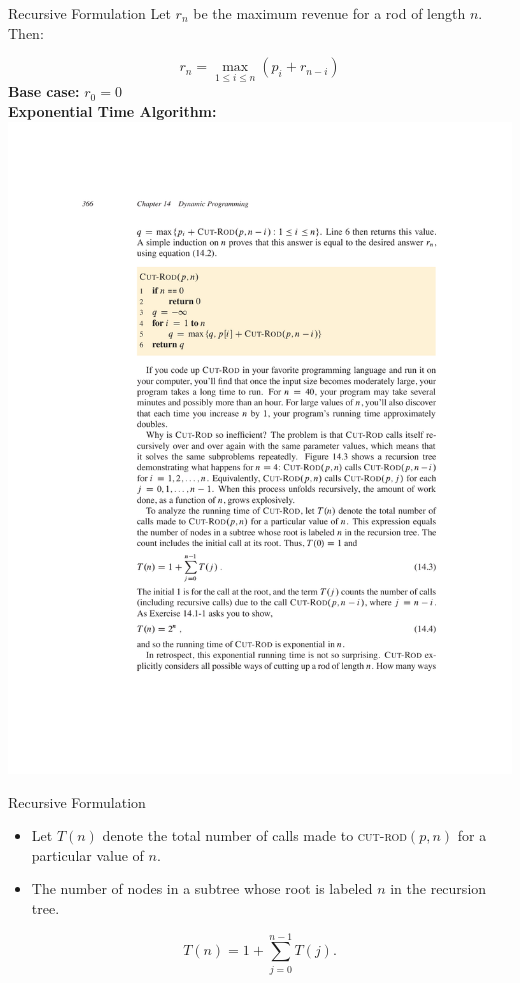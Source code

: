 \documentclass[aspectratio=169]{beamer}
\begin{document}
\begin{frame}{Recursive Formulation}
    Let $r_n$ be the maximum revenue for a rod of length $n$. Then:

    \[
        r_n = \max_{1 \leq i \leq n} (p_i + r_{n-i})
    \]
    \textbf{Base case:} $r_0 = 0$ \\

    \vspace{1em}
    \textbf{Exponential Time Algorithm:}
    \centering
    \includegraphics[width=\textwidth,clip=true,trim=4.75cm 18cm 3cm 6cm]{figures/p366}
\end{frame}

\begin{frame}{Recursive Formulation}
    \begin{itemize}
        \item Let $T(n)$ denote the total number of calls made to \textsc{cut-rod}$(p,n)$ for a particular value of $n$.
        \item The number of nodes in a subtree whose root is labeled $n$ in the recursion tree.
    \end{itemize}
    $$
        T(n) = 1 + \sum_{j = 0}^{n - 1} T(j).
    $$
\end{frame}
\end{document}
